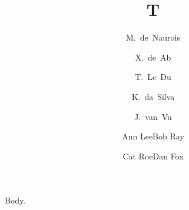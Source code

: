 \documentclass{article}
\begin{document}
\title{T}
\author{{\tiny M.\ de\ Naurois}
\and {\tiny X.~de~Ab}
\and {\ttfamily T.\ Le\ Du}
\and {\tiny\ttfamily K.\ da\ Silva}
\and J.\ van\ Vu
\and {\tiny Ann Lee\hspace{0.6em}Bob Ray}
\and {\ttfamily Cat Roe\quad Dan Fox}}
\maketitle
Body.
\end{document}
